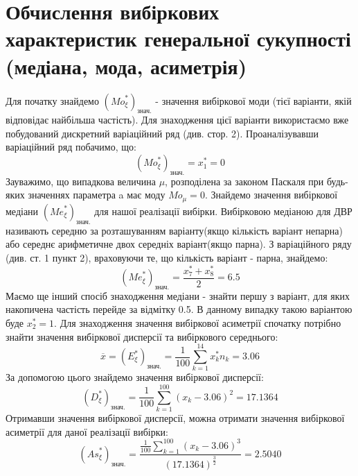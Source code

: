 \documentclass{article}
\begin{document}
\section{Обчислення вибіркових характеристик генеральної 
сукупності (медіана, мода, асиметрія)}
Для початку знайдемо $({Mo}_\xi^*)_{\text{знач.}}$ - 
значення вибіркової моди (тієї варіанти, якій відповідає 
найбільша частість). Для знаходження цієї варіанти використаємо
вже побудований дискретний варіаційний ряд (див. стор. 2).
Проаналізувавши варіаційний ряд побачимо, що:
$$({Mo}_\xi^*)_{\text{знач.}} = x_1^* = 0$$
Зауважимо, що випадкова величина $\mu$, розподілена за 
законом Паскаля при будь-яких значеннях параметра a
має моду ${Mo}_\mu = 0$.
\newline
\newline
Знайдемо значення вибіркової медіани $({Me}_\xi^*)_{\text{знач.}}$ 
для нашої реалізації вибірки. Вибірковою медіаною для ДВР називають 
середню за розташуванням варіанту(якщо кількість варіант непарна) 
або середнє арифметичне двох середніх варіант(якщо парна).
З варіаційного ряду (див. ст. 1 
пункт 2), враховуючи те, що кількість варіант - парна, 
знайдемо:$$ ({Me}_\xi^*)_{\text{знач.}} = \frac{x_7^* + x_8^*}
{2} = 6.5 $$
Маємо ще інший спосіб знаходження медіани - знайти першу з варіант, 
для яких накопичена частість перейде за відмітку 0.5. В данному випадку 
такою варіантою буде $x_2^* = 1.$
\newline
Для знаходження значення вибіркової асиметрії спочатку потрібно 
знайти значення вибіркової дисперсії та вибіркового середнього: 
$$\overline{x} = (E^*_{\xi})_{\text{знач.}} = \frac{1}{100} 
\sum_{k = 1}^{14} x_k^* n_k = 3.06$$
За допомогою цього знайдемо значення вибіркової дисперсії:
$$(D^*_{\xi})_{\text{знач.}} = \frac{1}{100} \sum_{k = 1}^{100}
(x_k - 3.06)^2 = 17.1364$$
Отримавши значення вибіркової дисперсії, можна отримати значення
вибіркової асиметрії для даної реалізації вибірки:
$$({As}_{\xi}^*)_{\text{знач.}} = \frac{\frac{1}{100}
\sum_{k = 1}^{100}(x_k - 3.06)^3}{(17.1364)^
{\frac{3}{2}}} = 2.5040$$
\end{document}
